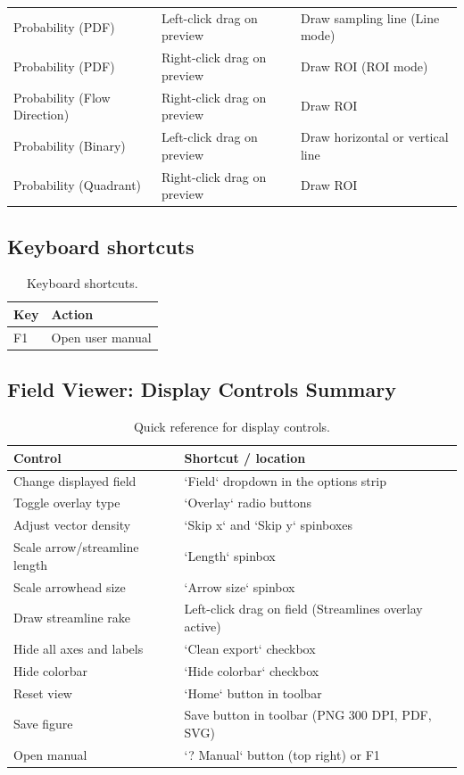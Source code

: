 \begin{table}[htbp]
\begin{tabular}{lp{4cm}p{6.5cm}}
Probability (PDF) & Left-click drag on preview & Draw sampling line (Line mode) \\
Probability (PDF) & Right-click drag on preview & Draw ROI (ROI mode) \\
Probability (Flow Direction) & Right-click drag on preview & Draw ROI \\
Probability (Binary) & Left-click drag on preview & Draw horizontal or vertical line \\
Probability (Quadrant) & Right-click drag on preview & Draw ROI \\
\bottomrule
\end{tabular}
\end{table}

\subsection{Keyboard shortcuts}

\begin{table}[htbp]
\centering
\caption{Keyboard shortcuts.}
\begin{tabular}{ll}
\toprule
\textbf{Key} & \textbf{Action} \\
\midrule
F1 & Open user manual \\
\bottomrule
\end{tabular}
\end{table}

\subsection{Field Viewer: Display Controls Summary}

\begin{table}[htbp]
\centering
\caption{Quick reference for display controls.}
\begin{tabular}{ll}
\toprule
\textbf{Control} & \textbf{Shortcut / location} \\
\midrule
Change displayed field     & `Field` dropdown in the options strip \\
Toggle overlay type        & `Overlay` radio buttons \\
Adjust vector density      & `Skip x` and `Skip y` spinboxes \\
Scale arrow/streamline length & `Length` spinbox \\
Scale arrowhead size       & `Arrow size` spinbox \\
Draw streamline rake       & Left-click drag on field (Streamlines overlay active) \\
Hide all axes and labels   & `Clean export` checkbox \\
Hide colorbar              & `Hide colorbar` checkbox \\
Reset view                 & `Home` button in toolbar \\
Save figure                & Save button in toolbar (PNG 300 DPI, PDF, SVG) \\
Open manual                & `? Manual` button (top right) or F1 \\
\bottomrule
\end{tabular}
\end{table}

\appendix

